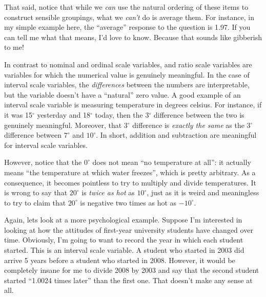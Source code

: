 That said, notice that while we {\it can} use the natural ordering of these items to construct sensible groupings, what we {\it can't} do is average them. For instance, in my simple example here, the ``average'' response to the question is 1.97. If you can tell me what that means, I'd love to know. Because that sounds like gibberish to me!


In contrast to nominal and ordinal scale variables,  and ratio scale variables are variables for which the numerical value is genuinely meaningful. In the case of interval scale variables, the {\it differences} between the numbers are interpretable, but the variable doesn't have a ``natural'' zero value. A good example of an interval scale variable is measuring temperature in degrees celsius. For instance, if it was 15$^\circ$ yesterday and 18$^\circ$ today, then the 3$^\circ$ difference between the two is genuinely meaningful. Moreover, that 3$^\circ$ difference is {\it exactly the same} as the 3$^\circ$ difference between $7^\circ$ and $10^\circ$. In short, addition and subtraction are meaningful for interval scale variables. 

However, notice that the $0^\circ$ does not mean ``no temperature at all'': it actually means ``the temperature at which water freezes'', which is pretty arbitrary. As a consequence, it becomes pointless to try to multiply and divide temperatures. It is wrong to say that $20^\circ$ is {\it twice as hot} as $10^\circ$, just as it is weird and meaningless to try to claim that $20^\circ$ is negative two times as hot as $-10^\circ$. 

Again, lets look at a more psychological example. Suppose I'm interested in looking at how the attitudes of first-year university students have changed over time. Obviously, I'm going to want to record the year in which each student started. This is an interval scale variable. A student who started in 2003 did arrive 5 years before a student who started in 2008. However, it would be completely insane for me to divide 2008 by 2003 and say that the second student started ``1.0024 times later'' than the first one. That doesn't make any sense at all.

